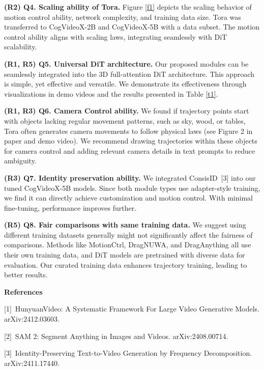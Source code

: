 \documentclass[10pt,twocolumn,letterpaper]{article}
\begin{document}
\noindent \textbf{(R2) Q4. Scaling ability of Tora.} Figure \ref{f1} depicts the scaling behavior of motion control ability, network complexity, and training data size. Tora was transferred to CogVideoX-2B and CogVideoX-5B with a data subset. The motion control ability aligns with scaling laws, integrating seamlessly with DiT scalability.

\noindent \textbf{(R1, R5) Q5. Universal DiT architecture.} Our proposed modules can be seamlessly integrated into the 3D full-attention DiT architecture. This approach is simple, yet effective and versatile. We demonstrate its effectiveness through visualizations in demo videos and the results presented in Table \ref{t1}.

\noindent \textbf{(R1, R3) Q6. Camera Control ability.} We found if trajectory points start with objects lacking regular movement patterns, such as sky, wood, or tables, Tora often generates camera movements to follow physical laws (see Figure 2 in paper and demo video). We recommend drawing trajectories within these objects for camera control and adding relevant camera details in text prompts to reduce ambiguity.

\noindent \textbf{(R3) Q7. Identity preservation ability.} We integrated ConsisID~[3] into our tuned CogVideoX-5B models. Since both module types use adapter-style training, we find it can directly achieve customization and motion control. With minimal fine-tuning, performance improves further.

\noindent \textbf{(R5) Q8. Fair comparisons with same training data.} We suggest using different training datasets generally might not significantly affect the fairness of comparisons. Methods like MotionCtrl, DragNUWA, and DragAnything all use their own training data, and DiT models are pretrained with diverse data for evaluation. Our curated training data enhances trajectory training, leading to better results.





\noindent \textbf{References}

\tiny{
\setlength{\parindent}{0pt}
[1]~HunyuanVideo: A Systematic Framework For Large Video Generative Models. arXiv:2412.03603.

[2]~SAM 2: Segment Anything in Images and Videos. arXiv:2408.00714.

[3]~Identity-Preserving Text-to-Video Generation by Frequency Decomposition. arXiv:2411.17440.

}

%     
%     
\end{document}
